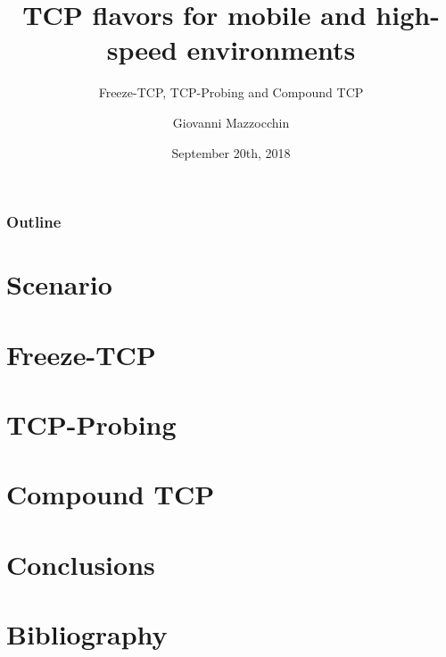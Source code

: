 \documentclass{beamer}
\title{TCP flavors for mobile and high-speed environments}
\subtitle{\newline Freeze-TCP, TCP-Probing and Compound TCP}
\author{Giovanni Mazzocchin}
\date{September 20th, 2018}
\institute{Università degli Studi di Padova}
\begin{document}
\newcommand{\turnOffNumbers}{true} %

\begin{frame}[noframenumbering]
\titlepage
\end{frame}

\let\turnOffNumbers\empty
\begin{frame}
	\frametitle{Outline}
	\tableofcontents
\end{frame}

\section{Scenario}



\section{Freeze-TCP}









\section{TCP-Probing}









\section{Compound TCP}













\section{Conclusions}
%
%

\appendix
\section{Bibliography}

\makethanks
\end{document}
